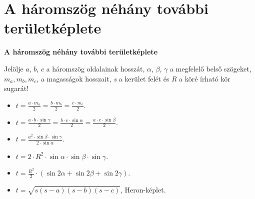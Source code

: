 \documentclass[11pt]{beamer}
\begin{document}
\section{\textbf{A háromszög néhány további területképlete}}
\begin{frame}[<+->]
\begin{block}{\textbf{A háromszög néhány további területképlete}}
\begin{list}{}{\leftmargin=1.5em}
\item Jelölje $a$, $b$, $c$ a háromszög oldalainak hosszát, $\alpha$, $\beta$, $\gamma$ a megfelelő belső szögeket, $m_a, m_b, m_c$, a magasságok hosszait, \textit{s} a kerület felét és \textit{R} a köré írható kör sugarát!
\end{list}
\begin{itemize}
\item $ t = \frac{a \cdot m_a}{2} = \frac{b \cdot m_b}{2} = \frac{c \cdot m_c}{2}$.
\item $ t = \frac{a \cdot b \cdot \sin\!\gamma} {2} = \frac{b \cdot c \cdot \sin\!\alpha} {2} = \frac{a \cdot c \cdot \sin\!\beta} {2}$.
\item $t = \frac{a^2 \cdot \sin\!\beta \cdot \sin\!\gamma}{2 \cdot \sin\!\alpha}$.
\item $t = 2 \cdot R^2 \cdot \sin\!\alpha \cdot \sin\!\beta \cdot \sin\!\gamma$.
\item $t = \frac{R^2}{2} \cdot (\sin\!2\alpha + \sin\!2\beta + \sin\!2\gamma)$.
\item $t = \sqrt{s(s-a)(s-b)(s-c)}$, Heron-képlet.
\end{itemize}
\end{block}
\end{frame}
\end{document}
